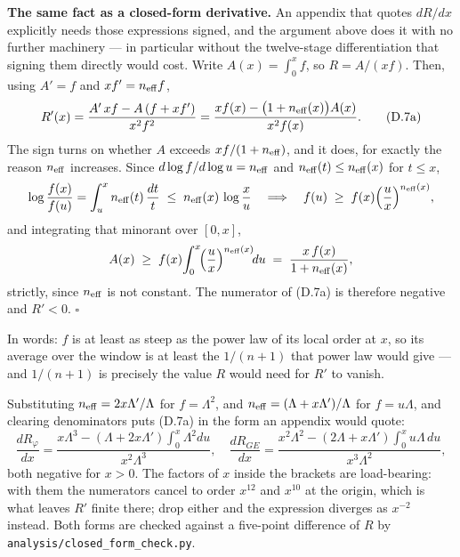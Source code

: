\documentclass[11pt]{article}
\begin{document}
\textbf{The same fact as a closed-form derivative.} An appendix that
quotes $dR/dx$ explicitly needs those expressions signed, and the
argument above does it with no further machinery --- in particular
without the twelve-stage differentiation that signing them directly
would cost. Write $A(x) = \int_0^xf$, so $R = A/(xf)$. Then, using
$A' = f$ and $xf' = n_{\rm eff}f$,
\begin{equation}
  R'(x) = \frac{A'\,xf - A\,(f + xf')}{x^2f^2}
        = \frac{x f(x) - \bigl(1 + n_{\rm eff}(x)\bigr)A(x)}{x^2 f(x)} .
  \tag{D.7a}
\end{equation}
The sign turns on whether $A$ exceeds $xf/(1+n_{\rm eff})$, and it does,
for exactly the reason $n_{\rm eff}$ increases. Since
$d\log f/d\log u = n_{\rm eff}$ and $n_{\rm eff}(t)\le n_{\rm eff}(x)$
for $t\le x$,
\[
  \log\frac{f(x)}{f(u)} = \int_u^x n_{\rm eff}(t)\,\frac{dt}{t}
  \;\le\; n_{\rm eff}(x)\,\log\frac{x}{u}
  \quad\Longrightarrow\quad
  f(u) \;\ge\; f(x)\Bigl(\frac{u}{x}\Bigr)^{n_{\rm eff}(x)} ,
\]
and integrating that minorant over $[0,x]$,
\[
  A(x) \;\ge\; f(x)\!\int_0^x\!\Bigl(\frac{u}{x}\Bigr)^{n_{\rm eff}(x)}\!du
       \;=\; \frac{x\,f(x)}{1 + n_{\rm eff}(x)} ,
\]
strictly, since $n_{\rm eff}$ is not constant. The numerator of (D.7a)
is therefore negative and $R'<0$. $\square$

In words: $f$ is at least as steep as the power law of its local order
at $x$, so its average over the window is at least the $1/(n{+}1)$ that
power law would give --- and $1/(n{+}1)$ is precisely the value $R$
would need for $R'$ to vanish.

Substituting $n_{\rm eff} = 2x\Lambda'/\Lambda$ for $f = \Lambda^2$, and
$n_{\rm eff} = (\Lambda + x\Lambda')/\Lambda$ for $f = u\Lambda$, and
clearing denominators puts (D.7a) in the form an appendix would quote:
\begin{equation}
  \frac{dR_\varphi}{dx}
  = \frac{x\Lambda^3 - (\Lambda + 2x\Lambda')\!\int_0^x\!\Lambda^2du}
         {x^2\Lambda^3},
  \quad
  \frac{dR_{GE}}{dx}
  = \frac{x^2\Lambda^2 - (2\Lambda + x\Lambda')\!\int_0^x\!u\Lambda\,du}
         {x^3\Lambda^2},
  \tag{D.7b}
\end{equation}
both negative for $x>0$. The factors of $x$ inside the brackets are
load-bearing: with them the numerators cancel to order $x^{12}$ and
$x^{10}$ at the origin, which is what leaves $R'$ finite there; drop
either and the expression diverges as $x^{-2}$ instead. Both forms are
checked against a five-point difference of $R$ by
\texttt{analysis/closed\_form\_check.py}.
\end{document}
